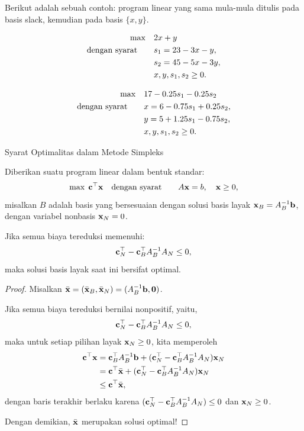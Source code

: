 Berikut adalah sebuah contoh: program linear yang sama mula-mula ditulis pada basis slack, kemudian pada basis $\{x, y\}$.

\[
\begin{aligned}
\max\quad & 2x + y \\
\mbox{dengan syarat}\quad\quad & s_1 = 23 - 3x - y,\\ 
& s_2 = 45 - 5x - 3y,\\ 
& x, y, s_1, s_2 \ge 0.
\end{aligned}
\]

\[
\begin{aligned}
\max\quad & 17 - 0.25s_1 - 0.25s_2 \\
\mbox{dengan syarat}\quad\quad & x = 6 - 0.75s_1 + 0.25s_2,\\ 
& y = 5 + 1.25s_1 - 0.75s_2,\\ 
& x, y, s_1, s_2 \ge 0.
\end{aligned}
\]

\begin{theorem}{Syarat Optimalitas dalam Metode Simpleks}{}

    Diberikan suatu program linear dalam bentuk standar:
    \[
    \max \; \mathbf{c}^\top \mathbf{x} \quad \mbox{dengan syarat}\quad \quad A \mathbf{x} = b, \quad \mathbf{x} \geq 0,
    \]
    misalkan \(B\) adalah basis yang bersesuaian dengan solusi basis layak \( \mathbf{x}_B = A_B^{-1}\mathbf{b}\), dengan variabel nonbasis \( \mathbf{x}_N = 0 \).

    Jika semua biaya tereduksi memenuhi:
    \[
   \mathbf{c}_N^\top -\mathbf{c}_B^\top A_B^{-1} A_N \leq 0,
    \]
    maka solusi basis layak saat ini bersifat optimal.
\end{theorem}
\begin{proof}
Misalkan $\bar {\mathbf{x}} = (\bar {\mathbf{x}}_B, \bar {\mathbf{x}}_N) = (A_B^{-1}\mathbf{b}, \mathbf{0})$.

    Jika semua biaya tereduksi bernilai nonpositif, yaitu,
    \[
   \mathbf{c}_N^\top -\mathbf{c}_B^\top A_B^{-1} A_N \leq 0,
    \]
    maka untuk setiap pilihan layak \( \mathbf{x}_N \geq 0 \), 
    kita memperoleh
    \begin{align}
    \mathbf{c}^\top \mathbf{x} &= \mathbf{c}_B^\top A_B^{-1}\mathbf{b}+  (\mathbf{c}_N^\top -\mathbf{c}_B^\top A_B^{-1} A_N )\mathbf{x}_N\\
    &= \mathbf{c}^\top \bar {\mathbf{x}} +  (\mathbf{c}_N^\top -\mathbf{c}_B^\top A_B^{-1} A_N )\mathbf{x}_N\\
    & \leq \mathbf{c}^\top \bar {\mathbf{x}},
    \end{align}
    dengan baris terakhir berlaku karena $(\mathbf{c}_N^\top -\mathbf{c}_B^\top A_B^{-1} A_N ) \leq 0$ dan $\mathbf{x}_N \geq 0$.
    
    Dengan demikian, $\bar {\mathbf{x}}$ merupakan solusi optimal!
\end{proof}


